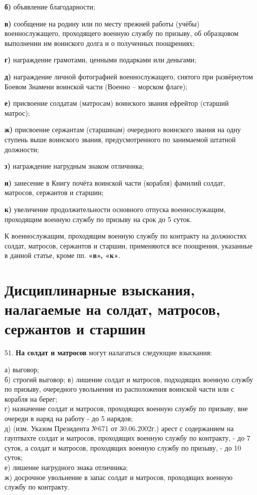 \documentclass[12pt,a4paper]{report}
\begin{document}
\textbf{б)} объявление  благодарности;

\textbf{в)} сообщение  на  родину  или  по  месту  прежней  работы  (учёбы)  военнослужащего,  проходящего  военную  службу  по  призыву,  об  образцовом  выполнении  им  воинского  долга  и  о  полученных  поощрениях;

\textbf{г)} награждение  грамотами,  ценными  подарками  или  деньгами;

\textbf{д)} награждение  личной  фотографией военнослужащего,  снятого  при  развёрнутом  Боевом  Знамени  воинской  части (Военно – морском  флаге);

\textbf{е)} присвоение  солдатам (матросам)  воинского  звания  ефрейтор  (старший  матрос);

\textbf{ж)} присвоение  сержантам  (старшинам)  очередного  воинского  звания  на  одну  ступень  выше  воинского  звания,  предусмотренного  по  занимаемой  штатной  должности;

\textbf{з)} награждение  нагрудным  знаком  отличника;

\textbf{и)} занесение  в  Книгу  почёта  воинской  части (корабля) фамилий  солдат,  матросов,  сержантов  и  старшин;

\textbf{к)} увеличение  продолжительности  основного  отпуска  военнослужащим,  проходящим  военную  службу  по  призыву  на  срок  до  5  суток.

  К  военнослужащим,  проходящим  военную  службу  по  контракту  на  должностях  солдат,  матросов,  сержантов  и  старшин,  применяются  все  поощрения,  указанные  в  данной  статье,  кроме  пп.  \textbf{«в», «к»}.

\section{Дисциплинарные взыскания, налагаемые на солдат, матросов, сержантов и старшин}
51.\textbf{ На солдат и матросов }могут налагаться следующие взыскания:

а) выговор;\\
б) строгий выговор;
в) лишение солдат и матросов, подходящих военную службу по призыву, очередного увольнения из расположения воинской части или с корабля на берег;\\
г) назначение солдат и матросов, проходящих военную службу по призыву, вне очереди в наряд на работу - до 5 нарядов;\\
д) (изм. Указом Президента №671 от 30.06.2002г.) арест с содержанием на гауптвахте солдат и матросов, проходящих военную службу по контракту, - до 7 суток, а солдат и матросов, проходящих военную службу по призыву, - до 10 суток;\\
е) лишение нагрудного знака отличника;\\
ж) досрочное увольнение в запас солдат и матросов, проходящих военную службу по контракту.\\
\end{document}
